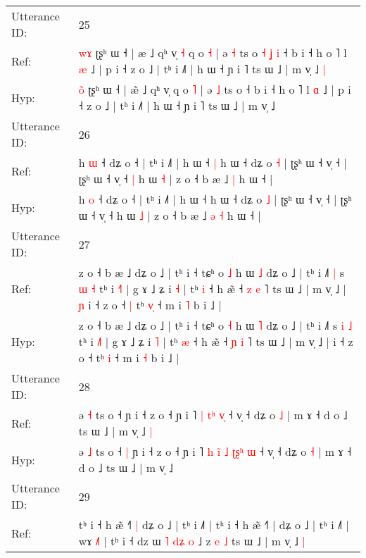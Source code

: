 \documentclass[10pt]{article}
\DeclareRobustCommand{\hl}[1]{{\textcolor{red}{#1}}}
\begin{document}
\begin{longtable}{ll}
 \\
\midrule
Utterance ID: & 25 \\
Ref: & \hl{w}\hl{ɤ} ʈʂʰ ɯ ˧ | æ\hl{} ˩ qʰ v̩\hl{ }\hl{˧} q o \hl{˧} | ə \hl{˧} ts o\hl{ }\hl{˧}\hl{ }\hl{ʝ}\hl{ }\hl{i} ˧ b i ˧ h o ˥ l \hl{æ} ˩ | p i ˧ z o ˩ | tʰ i ˩˥ | h ɯ ˧ ɲ i ˥ ts ɯ ˩ | m v̩ ˩\hl{ }\hl{|}
 \\
Hyp: & \hl{o}\hl{̃} ʈʂʰ ɯ ˧ | æ\hl{̃} ˩ qʰ v̩\hl{}\hl{} q o \hl{˥} | ə \hl{˩} ts o\hl{}\hl{}\hl{}\hl{}\hl{}\hl{} ˧ b i ˧ h o ˥ l \hl{ɑ} ˩ | p i ˧ z o ˩ | tʰ i ˩˥ | h ɯ ˧ ɲ i ˥ ts ɯ ˩ | m v̩ ˩\hl{}\hl{}
 \\
\midrule
Utterance ID: & 26 \\
Ref: & h \hl{ɯ} ˧ dʑ o ˧ | tʰ i ˩˥ | h ɯ ˧\hl{ }\hl{|} h ɯ ˧ dʑ o \hl{˧} | ʈʂʰ ɯ ˧ v̩ ˧ | ʈʂʰ ɯ ˧ v̩ ˧\hl{ }\hl{|} h ɯ \hl{˧} | z o ˧ b æ ˩\hl{}\hl{} \hl{|} h ɯ ˧ |
 \\
Hyp: & h \hl{o} ˧ dʑ o ˧ | tʰ i ˩˥ | h ɯ ˧\hl{}\hl{} h ɯ ˧ dʑ o \hl{˩} | ʈʂʰ ɯ ˧ v̩ ˧ | ʈʂʰ ɯ ˧ v̩ ˧\hl{}\hl{} h ɯ \hl{˩} | z o ˧ b æ ˩\hl{ }\hl{ə} \hl{˧} h ɯ ˧ |
 \\
\midrule
Utterance ID: & 27 \\
Ref: & z o ˧ b æ ˩ dʑ o ˩ | tʰ i ˧ tɕʰ o \hl{˩} h ɯ \hl{˩} dʑ o ˩ | tʰ i ˩˥\hl{ }\hl{|} s \hl{ɯ} \hl{˧} tʰ i \hl{˧}˥ | g ɤ ˩ ʑ i \hl{˧} | tʰ \hl{i} ˧ h æ̃ ˧ \hl{z} \hl{e} ˥ ts ɯ ˩ | m v̩ ˩ |\hl{ }\hl{ɲ} i ˧ z o ˧\hl{ }\hl{|} tʰ \hl{v}\hl{̩} ˧ m i \hl{˥} b i ˩ |
 \\
Hyp: & z o ˧ b æ ˩ dʑ o ˩ | tʰ i ˧ tɕʰ o \hl{˧} h ɯ \hl{˥} dʑ o ˩ | tʰ i ˩˥\hl{}\hl{} s \hl{i} \hl{˩} tʰ i \hl{˩}˥ | g ɤ ˩ ʑ i \hl{˥} | tʰ \hl{æ} ˧ h æ̃ ˧ \hl{ɲ} \hl{i} ˥ ts ɯ ˩ | m v̩ ˩ |\hl{}\hl{} i ˧ z o ˧\hl{}\hl{} tʰ \hl{}\hl{i} ˧ m i \hl{˧} b i ˩ |
 \\
\midrule
Utterance ID: & 28 \\
Ref: & ə \hl{˧} ts o ˧\hl{}\hl{} ɲ i ˧ z o ˧ ɲ i ˥ \hl{|} \hl{}\hl{}\hl{t}\hl{ʰ} \hl{}\hl{}\hl{}\hl{v}\hl{̩} ˧ v̩ ˧ dʑ o \hl{˩} | m ɤ ˧ d o ˩ ts ɯ ˩ | m v̩ ˩\hl{ }\hl{|}
 \\
Hyp: & ə \hl{˩} ts o ˧\hl{ }\hl{|} ɲ i ˧ z o ˧ ɲ i ˥ \hl{h} \hl{i}\hl{̃}\hl{ }\hl{˩} \hl{ʈ}\hl{ʂ}\hl{ʰ}\hl{ }\hl{ɯ} ˧ v̩ ˧ dʑ o \hl{˧} | m ɤ ˧ d o ˩ ts ɯ ˩ | m v̩ ˩\hl{}\hl{}
 \\
\midrule
Utterance ID: & 29 \\
Ref: & tʰ i ˧ h æ̃ ˧\hl{˥}\hl{ }\hl{|} dʑ o ˩ | tʰ i ˩˥ | tʰ i ˧ h æ̃ ˧˥ | dʑ o ˩ | tʰ i ˩˥ |\hl{}\hl{}\hl{}\hl{}\hl{}\hl{}\hl{} wɤ \hl{˩}˥ | tʰ i ˧ dz ɯ \hl{˥} \hl{d}\hl{ʑ} \hl{o} ˩ z\hl{ }\hl{e}\hl{ }\hl{˩} ts ɯ ˩ | m v̩ ˩\hl{ }\hl{|}
 \\

\end{longtable}
\end{document}
